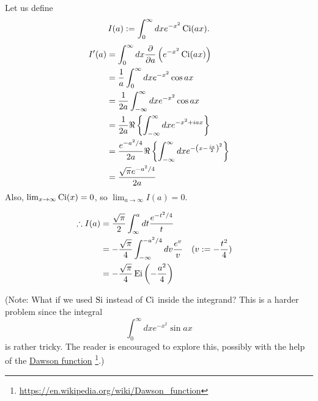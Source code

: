 \item

Let us define
\[
	I(a) := \int_0^\infty dx e^{-x^2} \operatorname{Ci}(ax).
\]
\begin{align*}
    I'(a)
    &= \int_0^\infty dx \frac{\partial}{\partial a} \left( e^{-x^2} \operatorname{Ci}(ax) \right) \\
    &= \frac{1}{a} \int_0^\infty dx e^{-x^2} \cos ax \\
    &= \frac{1}{2a} \int_{-\infty}^\infty dx e^{-x^2} \cos ax \\
    &= \frac{1}{2a} \Re \left\{ \int_{-\infty}^\infty dx e^{-x^2 + iax} \right\} \\
    &= \frac{e^{-a^2/4}}{2a} \Re \left\{ \int_{-\infty}^\infty dx e^{-{\left( x - \frac{ia}{2} \right)}^2} \right\} \\
    &= \frac{\sqrt{\pi} e^{-a^2/4}}{2a}
\end{align*}
Also, $\lim_{x \rightarrow \infty} \operatorname{Ci}(x) = 0$, so $\lim_{a \rightarrow \infty} I(a) = 0$.

\begin{align*}
    \therefore I(a)
    &= \frac{\sqrt{\pi}}{2} \int_\infty^a dt \frac{e^{-t^2/4}}{t} \\
    &= -\frac{\sqrt{\pi}}{4} \int_{-\infty}^{-a^2/4} dv \frac{e^v}{v} && (v := -\frac{t^2}{4}) \\
    &= -\frac{\sqrt{\pi}}{4} \operatorname{Ei}\left( -\frac{a^2}{4} \right)
\end{align*}

(Note: What if we used $\operatorname{Si}$ instead of $\operatorname{Ci}$ inside the integrand?
This is a harder problem since the integral
\[
    \int_0^\infty dx e^{-x^2} \sin ax
\]
is rather tricky.
The reader is encouraged to explore this, possibly with the help of the
\href{https://en.wikipedia.org/wiki/Dawson_function}{Dawson function}%
\footnote{\url{https://en.wikipedia.org/wiki/Dawson_function}}.)